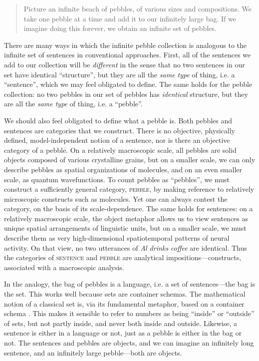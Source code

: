 \begin{quote}
    Picture an infinite beach of pebbles, of various sizes and compositions. We take one pebble at a time and add it to our infinitely large bag. If we imagine doing this forever, we obtain an infinite set of pebbles. 
\end{quote}

  There are many ways in which the infinite pebble collection is analogous to the infinite set of sentences in conventional approaches. First, all of the sentences we add to our collection will be \textit{different} in the sense that no two sentences in our set have identical “structure”, but they are all the \textit{same type} of thing, i.e. a “sentence”, which we may feel obligated to define. The same holds for the pebble collection: no two pebbles in our set of pebbles has \textit{identical} structure, but they are all the \textit{same type} of thing, i.e. a “pebble”. 
  
  We should also feel obligated to define what a pebble is. Both pebbles and sentences are categories that we construct. There is no objective, physically defined, model-independent notion of a sentence, nor is there an objective category of a pebble. On a relatively macroscopic scale, all pebbles are solid objects composed of various crystalline grains, but on a smaller scale, we can only describe pebbles as spatial organizations of molecules, and on an even smaller scale, as quantum wavefunctions. To count pebbles as “pebbles”, we must construct a sufficiently general category, \textsc{pebble}, by making reference to relatively microscopic constructs such as molecules. Yet one can always contest the category, on the basis of its scale-dependence. The same holds for sentences: on a relatively macroscopic scale, the object metaphor allows us to view sentences as unique spatial arrangements of linguistic units, but on a smaller scale, we must describe them as very high-dimensional spatiotemporal patterns of neural activity. On that view, no two utterances of \textit{Al drinks coffee} are identical. Thus the categories of \textsc{sentence} and \textsc{pebble} are analytical impositions—constructs, associated with a macroscopic analysis. 

  In the analogy, the bag of pebbles is a language, i.e. a set of sentences—the bag is the set. This works well because sets are container schemas. The mathematical notion of a classical set is, via its fundamental metaphor, based on a container schema \citep{LakoffNúñez2000}. This makes it sensible to refer to numbers as being “inside” or “outside” of sets, but not partly inside, and never both inside and outside. Likewise, a sentence is either in a language or not, just as a pebble is either in the bag or not. The sentences and pebbles are objects, and we can imagine an infinitely long sentence, and an infinitely large pebble—both are objects. 

